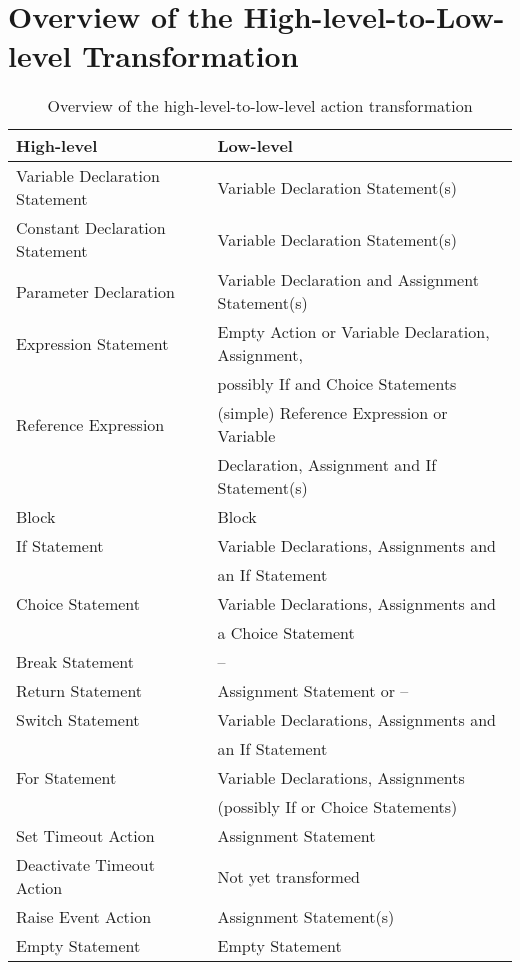 \section{Overview of the High-level-to-Low-level Transformation}
\begin{table}[H]
	\centering
	\renewcommand{\arraystretch}{1.5}
	\begin{tabular}{ | l | l | }
		\toprule
		\textbf{High-level} & \textbf{Low-level} \\
		\hline
		\midrule
		Variable Declaration Statement & Variable Declaration Statement(s) \\ \hline
		Constant Declaration Statement & Variable Declaration Statement(s) \\ \hline
		Parameter Declaration & Variable Declaration and Assignment Statement(s) \\ \hline
		Expression Statement & Empty Action or Variable Declaration, Assignment, \\
		& possibly If and Choice Statements\\ \hline
		Reference Expression & (simple) Reference Expression or Variable \\ 
		& Declaration, Assignment and If Statement(s)\\ \hline
		Block & Block \\ \hline
		If Statement & Variable Declarations, Assignments and \\ 
		& an If Statement  \\ \hline
		Choice Statement & Variable Declarations, Assignments and \\
		& a Choice Statement \\ \hline
		Break Statement & -- \\ \hline
		Return Statement & Assignment Statement or -- \\ \hline
		Switch Statement & Variable Declarations, Assignments and \\
		& an If Statement \\ \hline
		For Statement & Variable Declarations, Assignments  \\ 
		& (possibly If or Choice Statements)\\ \hline
		Set Timeout Action & Assignment Statement \\ \hline
		Deactivate Timeout Action & Not yet transformed \\ \hline
		Raise Event Action & Assignment Statement(s) \\ \hline
		Empty Statement & Empty Statement \\ \hline
		\bottomrule
	\end{tabular}
	\caption{Overview of the high-level-to-low-level action transformation}
	\label{tab:SCLLOverview}
\end{table}

